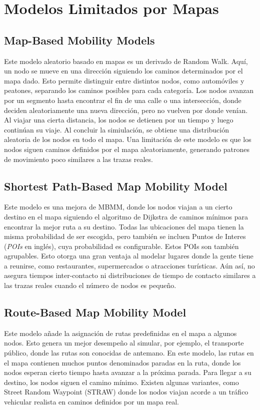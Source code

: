 \section{Modelos Limitados por Mapas}

\subsection{Map-Based Mobility Models}
Este modelo aleatorio basado en mapas es un derivado de Random Walk. Aquí, un nodo se mueve en una dirección siguiendo los caminos determinados por el mapa dado. Esto permite distinguir entre distintos nodos, como automóviles y peatones, separando los caminos posibles para cada categoría. Los nodos avanzan por un segmento hasta encontrar el fin de una calle o una intersección, donde deciden aleatoriamente una nueva dirección, pero no vuelven por donde venían. Al viajar una cierta distancia, los nodos se detienen por un tiempo y luego continúan su viaje. Al concluir la simiulación, se obtiene una distribución aleatoria de los nodos en todo el mapa. Una limitación de este modelo es que los nodos siguen caminos definidos por el mapa aleatoriamente, generando patrones de movimiento poco similares a las trazas reales. 

\subsection{Shortest Path-Based Map Mobility Model}

Este modelo es una mejora de MBMM, donde los nodos viajan a un cierto destino en el mapa siguiendo el algoritmo de Dijkstra de caminos mínimos para encontrar la mejor ruta a su destino. Todas las ubicaciones del mapa tienen la misma probabilidad de ser escogida, pero también se incluen Puntos de Interes (\emph{POIs} en inglés), cuya probabilidad es configurable. Estos POIs son también agrupables. Esto otorga una gran ventaja al modelar lugares donde la gente tiene a reunirse, como restaurantes, supermercados o atracciones turísticas. Aún así, no asegura tiempos inter-contacto ni distribuciones de tiempo de contacto similares a las trazas reales cuando el número de nodos es pequeño.

\subsection{Route-Based Map Mobility Model}

Este modelo añade la asignación de rutas predefinidas en el mapa a algunos nodos. Esto genera un mejor desempeño al simular, por ejemplo, el transporte público, donde las rutas son conocidas de antemano. En este modelo, las rutas en el mapa contienen muchos puntos denominados paradas en la ruta, donde los nodos esperan cierto tiempo hasta avanzar a la próxima parada. Para llegar a su destino, los nodos siguen el camino mínimo. Existen algunas variantes, como Street Random Waypoint (STRAW) donde los nodos viajan acorde a un tráfico vehicular realista en caminos definidos por un mapa real.

